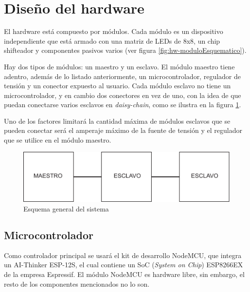 \section{Diseño del hardware}
El hardware está compuesto por módulos. Cada módulo es un dispositivo independiente que está armado con una matriz de LEDs de 8x8, un chip shifteador \cite{MAX7219} y componentes pasivos varios (ver figura \ref{fig:hw-moduloEsquematico}). 

Hay dos tipos de módulos: un maestro y un esclavo. El módulo maestro tiene adentro, además de lo listado anteriormente, un microcontrolador, regulador de tensión y un conector expuesto al usuario. Cada módulo esclavo no tiene un microcontrolador, y en cambio dos conectores en vez de uno, con la idea de que puedan conectarse varios esclavos en \emph{daisy-chain}, como se ilustra en la figura \ref{fig:esquema-general}.

Uno de los factores limitará la cantidad máxima de módulos esclavos que se pueden conectar será el amperaje máximo de la fuente de tensión y el regulador que se utilice en el módulo maestro.

\begin{figure}[ht!]
	\begin{center}
		\includegraphics[scale=1]{imagenes/hw/esquema-general.pdf}
		\caption{Esquema general del sistema}
		\label{fig:esquema-general}
	\end{center}
\end{figure}

\subsection{Microcontrolador}
Como controlador principal se usará el kit de desarrollo NodeMCU, que integra un AI-Thinker ESP-12S, el cual contiene un SoC (\emph{System on Chip}) ESP8266EX de la empresa Espressif. El módulo NodeMCU es hardware libre, sin embargo, el resto de los componentes mencionados no lo son.\cite{NodeMCU}

